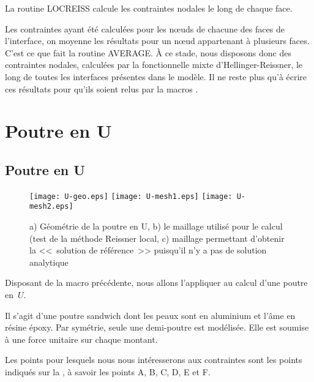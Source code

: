 \medskip
La routine LOCREISS calcule les contraintes nodales le long de chaque face.

\medskip
Les contraintes ayant été calculées pour les nœuds de chacune des faces de l'interface, on moyenne les résultats
pour un nœud appartenant à plusieurs faces. C'est ce que fait la routine AVERAGE. À ce stade, nous disposons donc
des contraintes nodales, calculées par la fonctionnelle mixte d'Hellinger-Reissner,
le long de toutes les interfaces présentes dans le modèle. Il ne reste plus qu'à écrire ces résultats pour qu'ils soient relus par la 
macros \ansys.










\medskip
\ifVersionAvecExemplesSepares
  \section{Poutre en U}
\else
  \subsection{Poutre en U}
\fi

\begin{figure}[ht]
  \texttt{[image: U-geo.eps]} \hfill
  \texttt{[image: U-mesh1.eps]}\hfill
  \texttt{[image: U-mesh2.eps]}
  \caption{\label{Fig-poutU-geo} a) Géométrie de la poutre en U, b) le maillage utilisé pour le calcul (test de la méthode Reissner local,
c) maillage permettant d'obtenir la <<~solution de référence~>> puisqu'il n'y a pas de solution analytique}
\end{figure}

Disposant de la macro précédente, nous allons l'appliquer au calcul d'une poutre en~$U$.

Il s'agit d'une poutre sandwich dont les peaux sont en aluminium et l'âme en résine époxy.
Par symétrie, seule une demi-poutre est modélisée. Elle est soumise à une force unitaire
sur chaque montant.

\medskip
Les points pour lesquels nous nous intéresserons aux contraintes sont les points indiqués sur la
, à savoir les points A, B, C, D, E et F.




